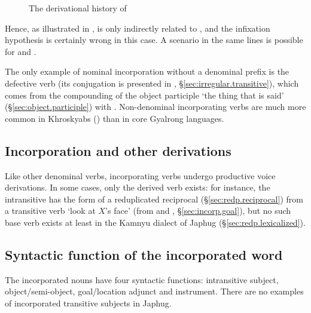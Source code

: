    \begin{figure}
   \caption{The derivational history of  } \label{fig:nWsWzRe}  
\end{figure}

Hence, as illustrated in ,  is only indirectly related to , and the infixation hypothesis is certainly wrong in this case. A scenario in the same lines is possible for  and .

The only example of nominal incorporation without a denominal prefix is the defective verb   (its conjugation is presented in , §\ref{sec:irregular.transitive}), which comes from the compounding of the object participle  `the thing that is said' (§\ref{sec:object.participle}) with . Non-denominal incorporating verbs are much more common in Khroskyabs (\citealt[388--411]{lai17khroskyabs}) than in core Gyalrong languages.

\subsection{Incorporation and other derivations} \label{sec:incorp.other}
Like other denominal verbs, incorporating verbs undergo productive voice derivations. In some cases, only the derived verb exists: for instance, the intransitive  has the form of a reduplicated reciprocal (§\ref{sec:redp.reciprocal}) from a transitive verb  `look at $X$'s face' (from  and , §\ref{sec:incorp.goal}), but no such base verb exists at least in the Kamnyu dialect of Japhug (§\ref{sec:redp.lexicalized}).
 
\subsection{Syntactic function of the incorporated word} \label{sec:incorp.noun.function}
The incorporated nouns have four syntactic functions: intransitive subject, object/semi-object, goal/location adjunct and instrument. There are no examples of incorporated transitive subjects in Japhug. 


